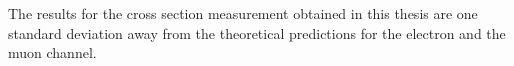 The results for the cross section measurement obtained in this thesis are one standard deviation away from the theoretical predictions for the electron and the muon channel. 
%
%
%
%
%

